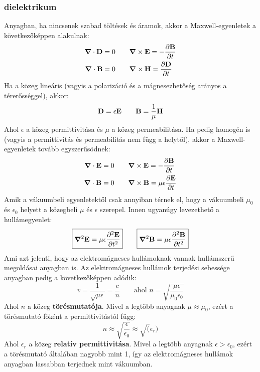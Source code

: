 \documentclass[a4paper,12pt]{article}
\begin{document}
\subsubsection*{dielektrikum}
Anyagban, ha nincsenek szabad töltések és áramok, akkor a Maxwell-egyenletek a következőképpen alakulnak:
\begin{equation}
    \begin{aligned}
        \boldsymbol{\nabla} \cdot \bold{D} &= 0 \qquad \boldsymbol{\nabla} \times \bold{E} = -\frac{\partial \bold{B}}{\partial t} \\
        \boldsymbol{\nabla} \cdot \bold{B} &= 0 \qquad \boldsymbol{\nabla} \times \bold{H} = \frac{\partial \bold{D}}{\partial t} 
    \end{aligned}
\end{equation}
Ha a közeg lineáris (vagyis a polarizáció és a mágnesezhetőség arányos a térerősséggel), akkor:
\begin{equation}
    \bold{D} = \epsilon \bold{E} \qquad \bold{B} = \frac{1}{\mu} \bold{H}
\end{equation}
Ahol $\epsilon$ a közeg permittivitása és $\mu$ a közeg permeabilitása. Ha pedig homogén is (vagyis a permittivitás és permeabilitás nem függ a helytől), akkor a Maxwell-egyenletek tovább egyszerűsödnek:
\begin{equation}
    \begin{aligned}
        \boldsymbol{\nabla} \cdot \bold{E} &= 0 \qquad \boldsymbol{\nabla} \times \bold{E} = -\frac{\partial \bold{B}}{\partial t} \\
        \boldsymbol{\nabla} \cdot \bold{B} &= 0 \qquad \boldsymbol{\nabla} \times \bold{B} = \mu \epsilon \frac{\partial \bold{E}}{\partial t} 
    \end{aligned}
\end{equation}
Amik a vákuumbeli egyenletektől csak annyiban térnek el, hogy a vákuumbeli $\mu_0$ és $\epsilon_0$ helyett a közegbeli $\mu$ és $\epsilon$ szerepel. Innen ugyanúgy levezethető a hullámegyenlet:
\begin{equation}
    \boxed{\boldsymbol{\nabla}^2 \bold{E} = \mu \epsilon \frac{\partial^2 \bold{E}}{\partial t^2}} \qquad \boxed{\boldsymbol{\nabla}^2 \bold{B} = \mu \epsilon \frac{\partial^2 \bold{B}}{\partial t^2}}
\end{equation}
Ami azt jelenti, hogy az elektromágneses hullámoknak vannak hullámszerű megoldásai anyagban is. Az elektromágneses hullámok terjedési sebessége anyagban pedig a következőképpen adódik:
\begin{equation}
    v = \frac{1}{\sqrt{\mu \epsilon}} = \frac{c}{n} \qquad \text{ahol } n = \sqrt{\frac{\mu \epsilon}{\mu_0 \epsilon_0}}
\end{equation}
Ahol $n$ a közeg \textbf{törésmutatója}. Mivel a legtöbb anyagnak $\mu \approx \mu_0$, ezért a törésmutató főként a permittivitástól függ:
\begin{equation}
    n \approx \sqrt{\frac{\epsilon}{\epsilon_0}} \approx \sqrt(\epsilon_r)
\end{equation}
Ahol $\epsilon_r$ a közeg \textbf{relatív permittivitása}. Mivel a legtöbb anyagnak $\epsilon > \epsilon_0$, ezért a törésmutató általában nagyobb mint 1, így az elektromágneses hullámok anyagban lassabban terjednek mint vákuumban.
\end{document}
